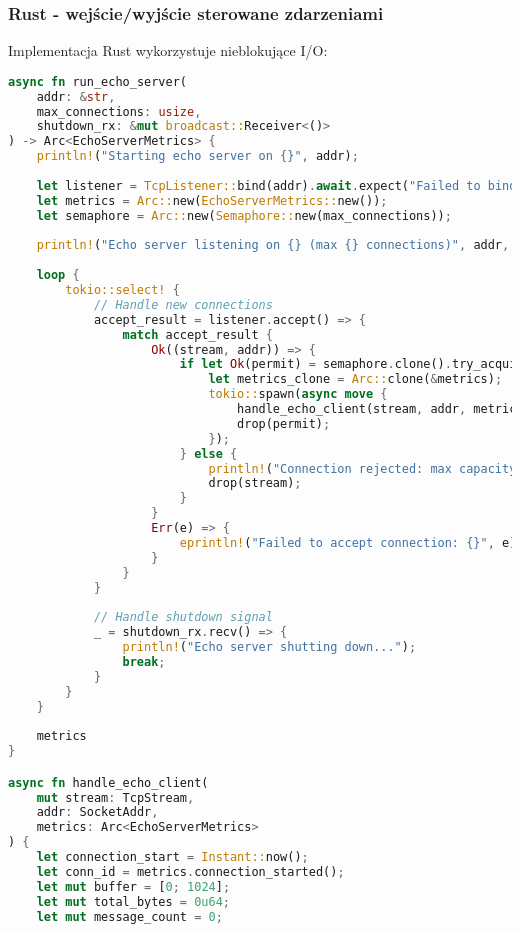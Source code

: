 \subsubsection{Rust - wejście/wyjście sterowane zdarzeniami}
Implementacja Rust wykorzystuje nieblokujące I/O:
\begin{lstlisting}[language=Rust, caption={Echo Serwer w Rust z Tokio}, label={lst:rust_echo_server}]
async fn run_echo_server(
    addr: &str, 
    max_connections: usize,
    shutdown_rx: &mut broadcast::Receiver<()>
) -> Arc<EchoServerMetrics> {
    println!("Starting echo server on {}", addr);
    
    let listener = TcpListener::bind(addr).await.expect("Failed to bind");
    let metrics = Arc::new(EchoServerMetrics::new());
    let semaphore = Arc::new(Semaphore::new(max_connections));
    
    println!("Echo server listening on {} (max {} connections)", addr, max_connections);
    
    loop {
        tokio::select! {
            // Handle new connections
            accept_result = listener.accept() => {
                match accept_result {
                    Ok((stream, addr)) => {
                        if let Ok(permit) = semaphore.clone().try_acquire_owned() {
                            let metrics_clone = Arc::clone(&metrics);
                            tokio::spawn(async move {
                                handle_echo_client(stream, addr, metrics_clone).await;
                                drop(permit);
                            });
                        } else {
                            println!("Connection rejected: max capacity reached");
                            drop(stream);
                        }
                    }
                    Err(e) => {
                        eprintln!("Failed to accept connection: {}", e);
                    }
                }
            }
            
            // Handle shutdown signal
            _ = shutdown_rx.recv() => {
                println!("Echo server shutting down...");
                break;
            }
        }
    }
    
    metrics
}

async fn handle_echo_client(
    mut stream: TcpStream, 
    addr: SocketAddr, 
    metrics: Arc<EchoServerMetrics>
) {
    let connection_start = Instant::now();
    let conn_id = metrics.connection_started();
    let mut buffer = [0; 1024];
    let mut total_bytes = 0u64;
    let mut message_count = 0;
    

\end{lstlisting}
